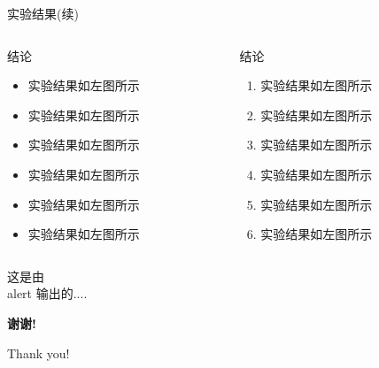 \documentclass[8pt,compress,t,noamsthm,notheorem,handout,table]{beamer}
\theoremstyle{nonumberplain}%
\theoremstyle{plain}
\begin{document}
\begin{frame}{实验结果(续)}
\begin{columns}[t,onlytextwidth]

	\begin{column}{0.30\textwidth}
		\begin{exampleblock}{结论}
			\begin{itemize}
				\item 实验结果如左图所示
				\item 实验结果如左图所示
				\item 实验结果如左图所示
				\item 实验结果如左图所示
				\item 实验结果如左图所示
				\item 实验结果如左图所示
			\end{itemize}
		\end{exampleblock}
	\end{column}
	
	\begin{column}{0.30\textwidth}
		\begin{alertblock}{结论}
			\begin{enumerate}
				\item 实验结果如左图所示
				\item 实验结果如左图所示
				\item 实验结果如左图所示
				\item 实验结果如左图所示
				\item 实验结果如左图所示
				\item 实验结果如左图所示
			\end{enumerate}
		\end{alertblock}
	\end{column}
\end{columns}
\alert{这是由 \\alert 输出的....}

\end{frame}

\begin{frame}[c,plain]
\begin{center}
\Huge\color{red}\heiti\bfseries 谢\quad 谢!

  Thank you!
\end{center}
\end{frame}
\end{document}
